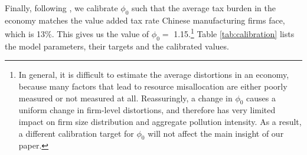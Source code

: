 \documentclass[AEJ]{AEA}
\begin{document}
Finally, following \citet{BentoRestuccia:2016}, we calibrate $\phi_0$ such that the average tax burden in the economy matches the value added tax rate Chinese manufacturing firms face, which is 13\%. This gives us the value of $\phi_0 =$ 1.15.\footnote{In general, it is difficult to estimate the average distortions in an economy, because many factors that lead to resource misallocation are either poorly measured or not measured at all. Reassuringly, a change in $\phi_0$ causes a uniform change in firm-level distortions, and therefore has very limited impact on firm size distribution and aggregate pollution intensity. As a result, a different calibration target for $\phi_0$ will not affect the main insight of our paper.} Table \ref{tab:calibration} lists the model parameters, their targets and the calibrated values.
\end{document}
